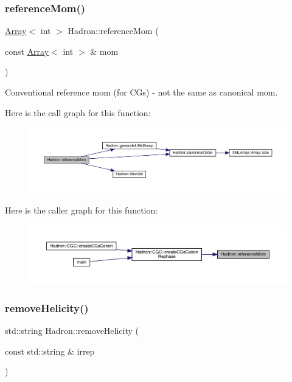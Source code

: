 \subsubsection{\texorpdfstring{referenceMom()}{referenceMom()}}
{\footnotesize\ttfamily \mbox{\hyperlink{classXMLArray_1_1Array}{Array}}$<$ int $>$ Hadron\+::reference\+Mom (\begin{DoxyParamCaption}\item[{const \mbox{\hyperlink{classXMLArray_1_1Array}{Array}}$<$ int $>$ \&}]{mom }\end{DoxyParamCaption})}



Conventional reference mom (for C\+Gs) -\/ not the same as canonical mom. 

Here is the call graph for this function\+:
\nopagebreak
\begin{figure}[H]
\begin{center}
\leavevmode
\includegraphics[width=350pt]{d1/daf/namespaceHadron_a8a4e39ac150585731d18fb970ec8a1bd_cgraph}
\end{center}
\end{figure}
Here is the caller graph for this function\+:
\nopagebreak
\begin{figure}[H]
\begin{center}
\leavevmode
\includegraphics[width=350pt]{d1/daf/namespaceHadron_a8a4e39ac150585731d18fb970ec8a1bd_icgraph}
\end{center}
\end{figure}
\mbox{\label{namespaceHadron_a877ae1e797f5cf4d4ebb7e22d5bbe69b}} 
\subsubsection{\texorpdfstring{removeHelicity()}{removeHelicity()}}
{\footnotesize\ttfamily std\+::string Hadron\+::remove\+Helicity (\begin{DoxyParamCaption}\item[{const std\+::string \&}]{irrep }\end{DoxyParamCaption})}



